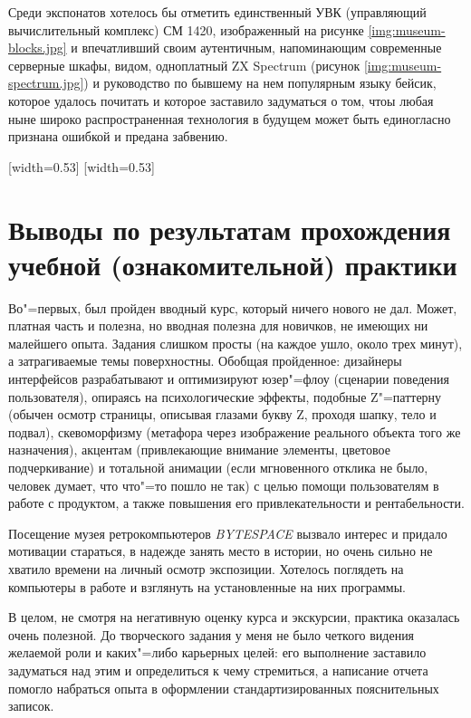 \documentclass[variant=practice]{bsuir}
\begin{document}
Среди экспонатов хотелось бы отметить единственный УВК (управляющий
вычислительный комплекс) СМ 1420, изображенный на рисунке
\ref{img:museum-blocks.jpg} и впечатливший своим аутентичным, напоминающим
современные серверные шкафы, видом, одноплатный ZX Spectrum (рисунок
\ref{img:museum-spectrum.jpg}) и руководство по бывшему на нем популярным языку
бейсик, которое удалось почитать и которое заставило задуматься о том, чтоы
любая ныне широко распространенная технология в будущем может быть единогласно
признана ошибкой и предана забвению.

[width=0.53\textwidth]
[width=0.53\textwidth]

\chapter*{Выводы по результатам прохождения учебной (ознакомительной) практики}

Во"=первых, был пройден вводный курс, который ничего нового не дал. Может,
платная часть и полезна, но вводная полезна для новичков, не имеющих ни
малейшего опыта. Задания слишком просты (на каждое ушло, около трех минут), а
затрагиваемые темы поверхностны. Обобщая пройденное: дизайнеры интерфейсов
разрабатывают и оптимизируют юзер"=флоу (сценарии поведения пользователя),
опираясь на психологические эффекты, подобные Z"=паттерну (обычен осмотр
страницы, описывая глазами букву Z, проходя шапку, тело и подвал), скевоморфизму
(метафора через изображение реального объекта того же назначения), акцентам
(привлекающие внимание элементы, цветовое подчеркивание) и тотальной анимации
(если мгновенного отклика не было, человек думает, что что"=то пошло не так) с
целью помощи пользователям в работе с продуктом, а также повышения его
привлекательности и рентабельности.

Посещение музея ретрокомпьютеров \textit{BYTESPACE} вызвало интерес и придало
мотивации стараться, в надежде занять место в истории, но очень сильно не
хватило времени на личный осмотр экспозиции. Хотелось поглядеть на компьютеры
в работе и взглянуть на установленные на них программы.

В целом, не смотря на негативную оценку курса и экскурсии, практика оказалась
очень полезной. До творческого задания у меня не было четкого видения желаемой
роли и каких"=либо карьерных целей: его выполнение заставило задуматься над этим
и определиться к чему стремиться, а написание отчета помогло набраться опыта в
оформлении стандартизированных пояснительных записок.


\end{document}
